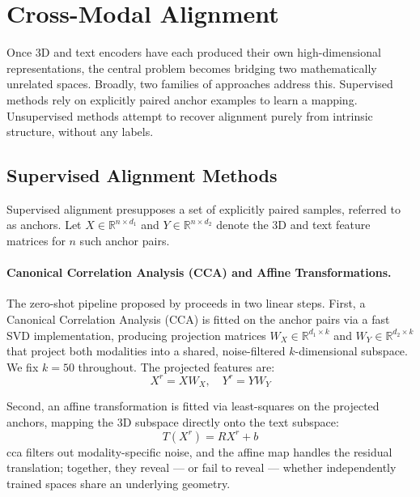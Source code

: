 \section{Cross-Modal Alignment}
\label{sec:cross_modal}

Once 3D and text encoders have each produced their own high-dimensional representations, the central problem becomes bridging two mathematically unrelated spaces. Broadly, two families of approaches address this. Supervised methods rely on explicitly paired anchor examples to learn a mapping. Unsupervised methods attempt to recover alignment purely from intrinsic structure, without any labels.

\subsection{Supervised Alignment Methods}
\label{subsec:supervised_alignment}

Supervised alignment presupposes a set of explicitly paired samples, referred to as anchors. Let $X \in \mathbb{R}^{n \times d_1}$ and $Y \in \mathbb{R}^{n \times d_2}$ denote the 3D and text feature matrices for $n$ such anchor pairs.

\paragraph{Canonical Correlation Analysis (CCA) and Affine Transformations.}
The zero-shot pipeline proposed by \textcite{hadgi2025escaping} proceeds in two linear steps. First, a Canonical Correlation Analysis (CCA) is fitted on the anchor pairs via a fast SVD implementation, producing projection matrices $W_X \in \mathbb{R}^{d_1 \times k}$ and $W_Y \in \mathbb{R}^{d_2 \times k}$ that project both modalities into a shared, noise-filtered $k$-dimensional subspace. We fix $k=50$ throughout. The projected features are:
\begin{equation}
    X^r = X W_X, \quad Y^r = Y W_Y
\end{equation}

Second, an affine transformation is fitted via least-squares on the projected anchors, mapping the 3D subspace directly onto the text subspace:
\begin{equation}
    T(X^r) = R X^r + b
\end{equation}
\gls{cca} filters out modality-specific noise, and the affine map handles the residual translation; together, they reveal --- or fail to reveal --- whether independently trained spaces share an underlying geometry.

